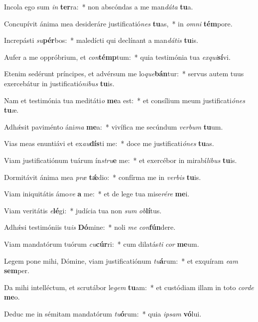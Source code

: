 \item Incola ego sum \textit{in} \textbf{ter}ra:~* non abscóndas a me man\textit{dá}\textit{ta} \textbf{tu}a.
\item Concupívit ánima mea desideráre justificatió\textit{nes} \textbf{tu}as,~* in \textit{om}\textit{ni} \textbf{tém}pore.
\item Increpásti \textit{su}\textbf{pér}bos:~* maledícti qui declínant a man\textit{dá}\textit{tis} \textbf{tu}is.
\item Aufer a me oppróbrium, et \textit{con}\textbf{témp}tum:~* quia testimónia tua \textit{ex}\textit{qui}\textbf{sí}vi.
\item Etenim sedérunt príncipes, et advérsum me lo\textit{que}\textbf{bán}tur:~* servus autem tuus exercebátur in justificatió\textit{ni}\textit{bus} \textbf{tu}is.
\item Nam et testimónia tua meditáti\textit{o} \textbf{me}a est:~* et consílium meum justificati\textit{ó}\textit{nes} \textbf{tu}æ.
\item Adhǽsit paviménto áni\textit{ma} \textbf{me}a:~* vivífica me secúndum \textit{ver}\textit{bum} \textbf{tu}um.
\item Vias meas enuntiávi et ex\textit{au}\textbf{dís}ti me:~* doce me justificati\textit{ó}\textit{nes} \textbf{tu}as.
\item Viam justificatiónum tuárum ín\textit{stru}\textbf{e} me:~* et exercébor in mirabí\textit{li}\textit{bus} \textbf{tu}is.
\item Dormitávit ánima mea \textit{præ} \textbf{tǽ}dio:~* confírma me in \textit{ver}\textit{bis} \textbf{tu}is.
\item Viam iniquitátis ámo\textit{ve} \textbf{a} me:~* et de lege tua mise\textit{ré}\textit{re} \textbf{me}i.
\item Viam veritátis \textit{e}\textbf{lé}gi:~* judícia tua non \textit{sum} \textit{ob}\textbf{lí}tus.
\item Adhǽsi testimóniis tu\textit{is} \textbf{Dó}mine:~* noli \textit{me} \textit{con}\textbf{fún}dere.
\item Viam mandatórum tuórum \textit{cu}\textbf{cúr}ri:~* cum dilatás\textit{ti} \textit{cor} \textbf{me}um.
\item Legem pone mihi, Dómine, viam justificatiónum \textit{tu}\textbf{á}rum:~* et exquíram \textit{e}\textit{am} \textbf{sem}per.
\item Da mihi intelléctum, et scrutábor le\textit{gem} \textbf{tu}am:~* et custódiam illam in toto \textit{cor}\textit{de} \textbf{me}o.
\item Deduc me in sémitam mandatórum \textit{tu}\textbf{ó}rum:~* quia \textit{ip}\textit{sam} \textbf{vó}lui.
